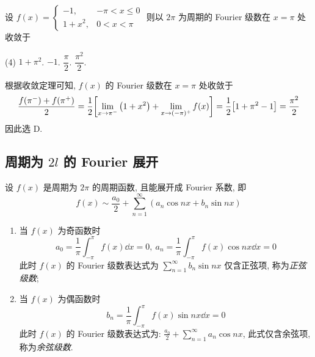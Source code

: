 \begin{example}
    设 $f(x)=\begin{cases}
        -1, & -\pi <x\leqslant 0\\ 1+x^2,&0<x<\pi
    \end{cases}$ 则以 $2\pi$ 为周期的 Fourier 级数在 $x=\pi$ 处收敛于 
    \begin{tasks}(4)
        \task $1+\pi^2$.
        \task $-1$.
        \task $\dfrac{\pi}{2}$.
        \task $\dfrac{\pi^2}{2}$.
    \end{tasks}
\end{example}
\begin{solution}
    根据收敛定理可知, $f(x)$ 的 Fourier 级数在 $x=\pi$ 处收敛于 $$
    \dfrac{f\qty(\pi^-)+f\qty(\pi^+)}{2}=\dfrac{1}{2}\qty[\lim_{x \to \pi^-}\qty(1+x^2)+\lim_{x \to (-\pi)^+}f(x)]=\dfrac{1}{2}\qty[1+\pi^2-1]=\dfrac{\pi^2}{2}
    $$
    因此选 D.
\end{solution}

\subsection{周期为 \texorpdfstring{$2l$}. 的 Fourier 展开}

\begin{definition}[正弦级数与余弦级数]
    设 $ f(x) $ 是周期为 $ 2 \pi $ 的周期函数, 且能展开成 Fourier 系数, 即
    $$f(x) \sim \frac{a_{0}}{2}+\sum_{n=1}^{\infty}\left(a_{n} \cos n x+b_{n} \sin n x\right)$$
    \begin{enumerate}[label=(\arabic{*})]
        \item 当 $ f(x) $ 为奇函数时
              $$a_{0}=\frac{1}{\pi} \int_{-\pi}^{\pi} f(x) \dd  x=0,~ a_{n}=\frac{1}{\pi} \int_{-\pi}^{\pi} f(x) \cos n x \dd  x=0$$
              此时 $ f(x) $ 的 Fourier 级数表达式为 $\displaystyle \sum_{n=1}^{\infty} b_{n} \sin n x $ 仅含正弦项, 称为\textit{正弦级数};
        \item 当 $ f(x) $ 为偶函数时
              $$b_{n}=\frac{1}{\pi} \int_{-\pi}^{\pi} f(x) \sin n x \dd  x=0$$
              此时 $ f(x) $ 的 Fourier 级数表达式为: $\displaystyle \frac{a_{0}}{2}+\sum_{n=1}^{\infty} a_{n} \cos n x$, 此式仅含余弦项, 
              称为\textit{余弦级数}.
    \end{enumerate}
\end{definition}

